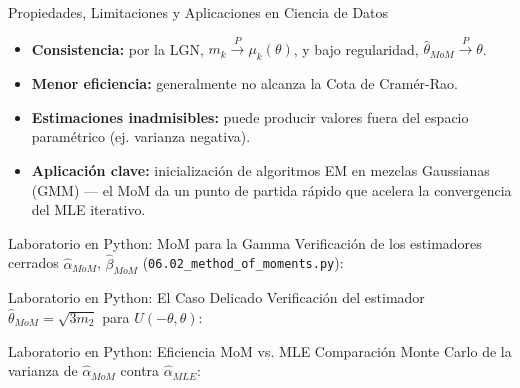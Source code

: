 \documentclass[10pt, aspectratio=169]{beamer}
\begin{document}
\begin{frame}{Propiedades, Limitaciones y Aplicaciones en Ciencia de Datos}
  \footnotesize
  \begin{itemize}\itemsep=0.1cm
    \item \textbf{Consistencia:} por la LGN, $m_k\xrightarrow{P}\mu_k(\theta)$, y bajo regularidad, $\hat\theta_{MoM}\xrightarrow{P}\theta$. \pause
    \item \textbf{Menor eficiencia:} generalmente no alcanza la Cota de Cramér-Rao. \pause
    \item \textbf{Estimaciones inadmisibles:} puede producir valores fuera del espacio paramétrico (ej. varianza negativa). \pause
    \item \textbf{Aplicación clave:} inicialización de algoritmos EM en mezclas Gaussianas (GMM) --- el MoM da un punto de partida rápido que acelera la convergencia del MLE iterativo.
  \end{itemize}
\end{frame}

\begin{frame}[fragile]{Laboratorio en Python: MoM para la Gamma}
  \scriptsize
  Verificación de los estimadores cerrados $\hat\alpha_{MoM}$, $\hat\beta_{MoM}$ (\texttt{06.02\_method\_of\_moments.py}):
  {
  }
\end{frame}

\begin{frame}[fragile]{Laboratorio en Python: El Caso Delicado}
  \scriptsize
  Verificación del estimador $\hat\theta_{MoM}=\sqrt{3m_2}$ para $U(-\theta,\theta)$:
  {
  }
\end{frame}

\begin{frame}[fragile]{Laboratorio en Python: Eficiencia MoM vs. MLE}
  \scriptsize
  Comparación Monte Carlo de la varianza de $\hat\alpha_{MoM}$ contra $\hat\alpha_{MLE}$:
  {
  }
\end{frame}
\end{document}
